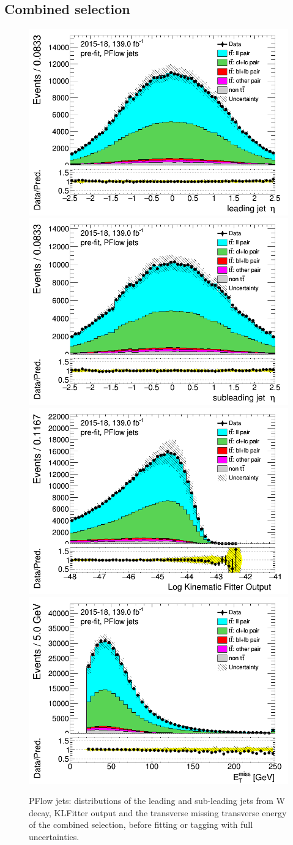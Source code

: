 \documentclass[letterpaper,12pt]{article}
\begin{document}
	

	\newpage
	\subsection{Combined selection}
	\label{sec:appendix_combined_selection}
	\newpage	
	\begin{figure}[H]
	\includegraphics[width=.45\textwidth]{FTAG_plots/pretagNoRwwithhighpTPFlowall/DataMC_h_J0_eta.png}
	\includegraphics[width=.45\textwidth]{FTAG_plots/pretagNoRwwithhighpTPFlowall/DataMC_h_J1_eta.png}\\
	\includegraphics[width=.45\textwidth]{FTAG_plots/pretagNoRwwithhighpTPFlowall/DataMC_h_LLR.png}
	\includegraphics[width=.45\textwidth]{FTAG_plots/pretagNoRwwithhighpTPFlowall/DataMC_h_MET.png}\\
	
	\caption{PFlow jets: distributions of the leading and sub-leading jets 
	from W decay, KLFitter output and the transverse missing transverse 
	energy of the combined selection, before fitting or tagging with 
	full uncertainties.} \label{fig:combined_jets_PFlow}
	\end{figure}
	
\end{document}
